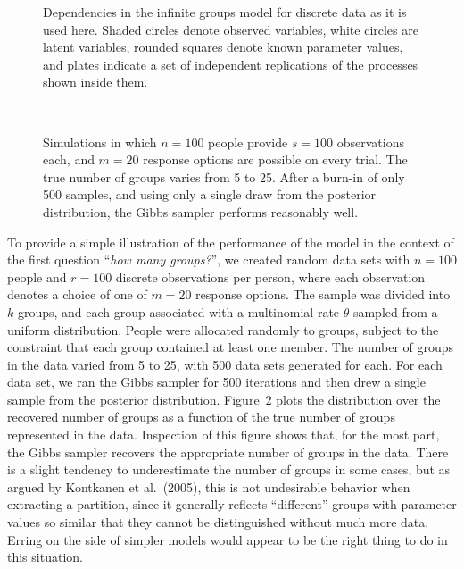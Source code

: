 \documentclass[authoryear]{elsarticle}
\newcommand{\bfc}{}
\newcommand{\efc}{\vspace*{15pt}}
\newcommand{\fcs}{}
\begin{document}
\begin{figure}[t]\begin{center}
\caption{\bfc Dependencies in the \fcs  infinite groups model for discrete
data as it is used here. Shaded \fcs circles denote observed variables,
white circles are latent \fcs  variables, rounded squares \fcs denote
known parameter values, and plates indicate a set of independent
replications \fcs of the processes shown inside them. \efc}
\label{indivdiffs}\end{center}\end{figure}

\begin{figure}[t]
\begin{center}
 \\
\caption{\bfc Simulations in \fcs which $n=100$ people provide $s=100$ observations
  each, and \fcs $m=20$ response options are possible on every trial.
 The true number of groups varies from 5 to 25. After a burn-in of only 500 samples,
and using only a single draw from the posterior distribution,
 the Gibbs sampler performs reasonably well.\efc}
\label{montecarlo}
\end{center}
\end{figure}

To provide a simple illustration of the performance of the model in the
context of the first question ``{\it how many groups?}'',
we created random data sets with $n=100$ people and
$r=100$ discrete observations per person, where each observation denotes a
choice of one of $m=20$ response options. The sample was divided into $k$
groups, and each group associated with a multinomial rate $\theta$ sampled
from a uniform distribution. People were allocated randomly to groups,
subject to the constraint that each group contained at least one member.
The number of groups in the data varied from 5 to 25, with 500 data sets generated
for each. For each data set, we ran the Gibbs sampler for 500 iterations and
then drew a single sample from the posterior distribution. Figure~\ref{montecarlo}
plots the distribution over the recovered number of groups as a function of the
true number of groups represented in the data. Inspection of this figure shows that,
for the most part, the Gibbs sampler recovers the appropriate number of groups in
the data. There is a slight tendency to underestimate the number of groups in
some cases, but as argued by Kontkanen et al.\ (2005), this is not undesirable
behavior when extracting a partition, since it generally reflects ``different''
groups with parameter values so similar that they cannot be distinguished without
much more data. Erring on the side of simpler models would appear to be the right
thing to do in this situation.
\end{document}
